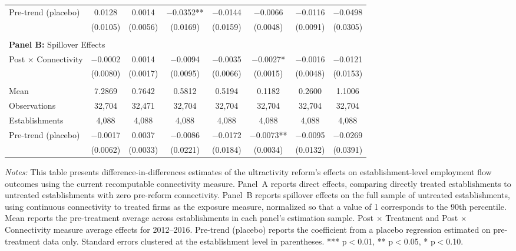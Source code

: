 \documentclass[11pt]{article}
\begin{document}
\begin{table}[H]
\begin{tabular}{lccccccc}
\midrule
Pre-trend (placebo) & 0.0128 & 0.0014 & $-$0.0352** & $-$0.0144 & $-$0.0066 & $-$0.0116 & $-$0.0498\\
 & (0.0105) & (0.0056) & (0.0169) & (0.0159) & (0.0048) & (0.0091) & (0.0305)\\
 &  &  &  &  &  &  & \\
\midrule
\multicolumn{8}{l}{\textbf{Panel B:} Spillover Effects} \\
Post $\times$ Connectivity & $-$0.0002 & 0.0014 & $-$0.0094 & $-$0.0035 & $-$0.0027* & $-$0.0016 & $-$0.0121\\
 & (0.0080) & (0.0017) & (0.0095) & (0.0066) & (0.0015) & (0.0048) & (0.0153)\\
 &  &  &  &  &  &  & \\
Mean & 7.2869 & 0.7642 & 0.5812 & 0.5194 & 0.1182 & 0.2600 & 1.1006\\
Observations & 32{,}704 & 32{,}471 & 32{,}704 & 32{,}704 & 32{,}704 & 32{,}704 & 32{,}704\\
Establishments & 4{,}088 & 4{,}088 & 4{,}088 & 4{,}088 & 4{,}088 & 4{,}088 & 4{,}088\\
\midrule
Pre-trend (placebo) & $-$0.0017 & 0.0037 & $-$0.0086 & $-$0.0172 & $-$0.0073** & $-$0.0095 & $-$0.0269\\
 & (0.0062) & (0.0033) & (0.0221) & (0.0184) & (0.0034) & (0.0132) & (0.0391)\\
\bottomrule\bottomrule
\end{tabular}
\begin{minipage}{\linewidth}\vspace{4pt}
\scriptsize\textit{Notes:} This table presents difference-in-differences estimates of the ultractivity reform's effects on establishment-level employment flow outcomes using the current recomputable connectivity measure. Panel~A reports direct effects, comparing directly treated establishments to untreated establishments with zero pre-reform connectivity. Panel~B reports spillover effects on the full sample of untreated establishments, using continuous connectivity to treated firms as the exposure measure, normalized so that a value of 1 corresponds to the 90th percentile. Mean reports the pre-treatment average across establishments in each panel's estimation sample. Post $\times$ Treatment and Post $\times$ Connectivity measure average effects for 2012--2016. Pre-trend (placebo) reports the coefficient from a placebo regression estimated on pre-treatment data only. Standard errors clustered at the establishment level in parentheses. *** p$<$0.01, ** p$<$0.05, * p$<$0.10.
\end{minipage}
\end{table}
\end{document}
